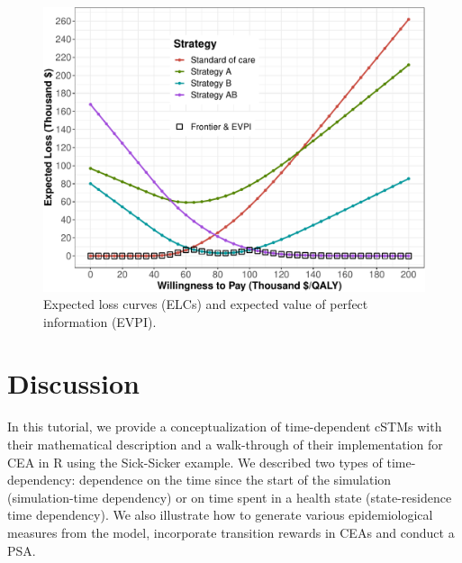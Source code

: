 \documentclass[
]{article}
\begin{document}
\begin{figure}[H]

{\centering \includegraphics{figs/ELC-AgeDep-1} 

}

\caption{Expected loss curves (ELCs) and expected value of perfect information (EVPI).}\label{fig:ELC-AgeDep}
\end{figure}

\hypertarget{discussion}{%
\section{Discussion}\label{discussion}}

In this tutorial, we provide a conceptualization of time-dependent cSTMs with their mathematical description and a walk-through of their implementation for CEA in R using the Sick-Sicker example. We described two types of time-dependency: dependence on the time since the start of the simulation (simulation-time dependency) or on time spent in a health state (state-residence time dependency). We also illustrate how to generate various epidemiological measures from the model, incorporate transition rewards in CEAs and conduct a PSA.
\end{document}
